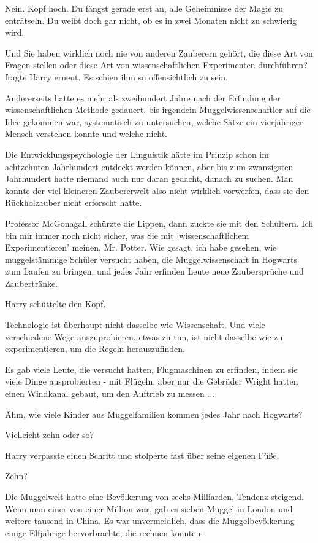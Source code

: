 Nein. Kopf hoch. Du fängst gerade erst an, alle Geheimnisse der Magie zu
enträtseln. Du weißt doch gar nicht, ob es in zwei Monaten nicht zu schwierig
wird.

\glqq{}Und Sie haben wirklich noch nie von anderen Zauberern gehört, die diese
Art von Fragen stellen oder diese Art von wissenschaftlichen Experimenten
durchführen?\grqq{} fragte Harry erneut. Es schien ihm so offensichtlich zu
sein.

Andererseits hatte es mehr als zweihundert Jahre nach der Erfindung der
wissenschaftlichen Methode gedauert, bis irgendein Muggelwissenschaftler auf die
Idee gekommen war, systematisch zu untersuchen, welche Sätze ein vierjähriger
Mensch verstehen konnte und welche nicht.

Die Entwicklungspsychologie der Linguistik hätte im Prinzip schon im achtzehnten
Jahrhundert entdeckt werden können, aber bis zum zwanzigsten Jahrhundert hatte
niemand auch nur daran gedacht, danach zu suchen. Man konnte der viel kleineren
Zaubererwelt also nicht wirklich vorwerfen, dass sie den Rückholzauber nicht
erforscht hatte.

Professor McGonagall schürzte die Lippen, dann zuckte sie mit den Schultern.
\glqq{}Ich bin mir immer noch nicht sicher, was Sie mit 'wissenschaftlichem
Experimentieren' meinen, Mr. Potter. Wie gesagt, ich habe gesehen, wie
muggelstämmige Schüler versucht haben, die Muggelwissenschaft in Hogwarts zum
Laufen zu bringen, und jedes Jahr erfinden Leute neue Zaubersprüche und
Zaubertränke.\grqq{}

Harry schüttelte den Kopf.

\glqq{}Technologie ist überhaupt nicht dasselbe wie Wissenschaft. Und viele
verschiedene Wege auszuprobieren, etwas zu tun, ist nicht dasselbe wie zu
experimentieren, um die Regeln herauszufinden.\grqq{}

Es gab viele Leute, die versucht hatten, Flugmaschinen zu erfinden, indem sie
viele Dinge ausprobierten - mit Flügeln, aber nur die Gebrüder Wright hatten
einen Windkanal gebaut, um den Auftrieb zu messen ...

\glqq{}Ähm, wie viele Kinder aus Muggelfamilien kommen jedes Jahr nach
Hogwarts?\grqq{}

\glqq{}Vielleicht zehn oder so?\grqq{}

Harry verpasste einen Schritt und stolperte fast über seine eigenen Füße.

\glqq{}Zehn?\grqq{}

Die Muggelwelt hatte eine Bevölkerung von sechs Milliarden, Tendenz steigend.
Wenn man einer von einer Million war, gab es sieben Muggel in London und weitere
tausend in China. Es war unvermeidlich, dass die Muggelbevölkerung einige
Elfjährige hervorbrachte, die rechnen konnten -

